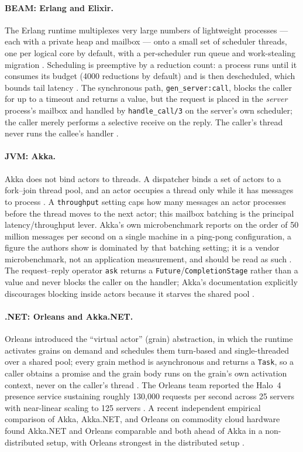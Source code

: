 \documentclass[11pt]{article}
\begin{document}
\paragraph{BEAM: Erlang and Elixir.} The Erlang runtime multiplexes very large
numbers of lightweight processes --- each with a private heap and mailbox ---
onto a small set of scheduler threads, one per logical core by default, with a
per-scheduler run queue and work-stealing migration \cite{beambook}. Scheduling
is preemptive by a reduction count: a process runs until it consumes its budget
(4000 reductions by default) and is then descheduled, which bounds tail latency
\cite{beambook}. The synchronous path, \texttt{gen\_server:call}, blocks the
caller for up to a timeout and returns a value, but the request is placed in the
\emph{server} process's mailbox and handled by \texttt{handle\_call/3} on the
server's own scheduler; the caller merely performs a selective receive on the
reply. The caller's thread never runs the callee's handler
\cite{armstrong1996}.

\paragraph{JVM: Akka.} Akka does not bind actors to threads. A dispatcher binds
a set of actors to a fork--join thread pool, and an actor occupies a thread only
while it has messages to process \cite{akka}. A \texttt{throughput} setting caps
how many messages an actor processes before the thread moves to the next actor;
this mailbox batching is the principal latency/throughput lever. Akka's own
microbenchmark reports on the order of 50 million messages per second on a single
machine in a ping-pong configuration, a figure the authors show is dominated by
that batching setting; it is a vendor microbenchmark, not an application
measurement, and should be read as such \cite{letitcrash}. The request--reply
operator \texttt{ask} returns a \texttt{Future}/\texttt{CompletionStage} rather
than a value and never blocks the caller on the handler; Akka's documentation
explicitly discourages blocking inside actors because it starves the shared pool
\cite{akka}.

\paragraph{.NET: Orleans and Akka.NET.} Orleans introduced the ``virtual actor''
(grain) abstraction, in which the runtime activates grains on demand and
schedules them turn-based and single-threaded over a shared pool; every grain
method is asynchronous and returns a \texttt{Task}, so a caller obtains a promise
and the grain body runs on the grain's own activation context, never on the
caller's thread \cite{orleans}. The Orleans team reported the Halo~4 presence
service sustaining roughly 130{,}000 requests per second across 25 servers with
near-linear scaling to 125 servers \cite{orleansmsr2014}. A recent independent
empirical comparison of Akka, Akka.NET, and Orleans on commodity cloud hardware
found Akka.NET and Orleans comparable and both ahead of Akka in a
non-distributed setup, with Orleans strongest in the distributed setup
\cite{camilleri2023}.
\end{document}
